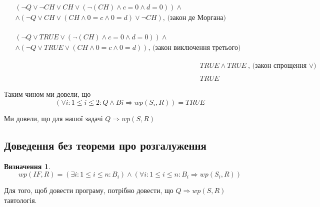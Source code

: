 \documentclass[14pt,a4paper]{extarticle}
\theoremstyle{definition}
\newtheorem{definition}{Визначення}[section]
\begin{document}
\begin{enumerate}
\begin{align*}
    \begin{split}
      &(\lnot Q \lor \lnot CH \lor CH
        \lor (\lnot(CH) \land c = 0 \land d = 0)) \land \\
      &\land (\lnot Q \lor CH \lor (CH \land 0 = c \land 0 = d)
        \lor \lnot CH) \text{, (закон де Моргана)} \\
    \end{split}\\\\
    \begin{split}
      &(\lnot Q \lor TRUE
        \lor (\lnot(CH) \land c = 0 \land d = 0)) \land \\
      &\land (\lnot Q \lor TRUE \lor (CH \land 0 = c \land 0 = d))
        \text{, (закон виключення третього)} \\
    \end{split}\\\\
    &TRUE \land TRUE\text{, (закон спрощення $\lor$)} \\\\
    &TRUE
  \end{align*}

  Таким чином ми довели, що
  \begin{equation}
    (\forall i: 1 \leq i \leq 2: Q \land Bi \Rightarrow
      \mathit{wp}(S_i, R)) = TRUE
  \end{equation}
\end{enumerate}

Ми довели, що для нашої задачі $Q \Rightarrow \mathit{wp}(S,R)$

\subsection{Доведення без теореми про розгалуження}

\begin{definition}
  \[\mathit{wp}(IF, R) = (\exists i:1 \leq i \leq n:B_i)\land
    (\forall i: 1 \leq i \leq n: B_i \Rightarrow \mathit{wp}(S_i, R))\]
\end{definition}

Для того, щоб довести програму, потрібно довести, що
$Q \Rightarrow \mathit{wp}(S,R)$ тавтологія.
\end{document}
